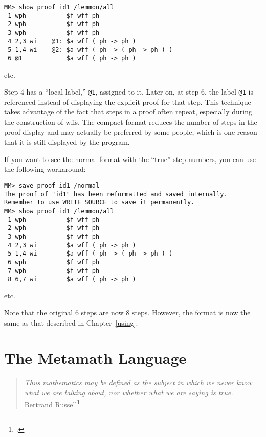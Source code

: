 \begin{verbatim}
MM> show proof id1 /lemmon/all
 1 wph           $f wff ph
 2 wph           $f wff ph
 3 wph           $f wff ph
 4 2,3 wi    @1: $a wff ( ph -> ph )
 5 1,4 wi    @2: $a wff ( ph -> ( ph -> ph ) )
 6 @1            $a wff ( ph -> ph )
\end{verbatim}

\begin{center}
{etc.}
\end{center}

Step 4 has a ``local label,'' \texttt{@1}, assigned to it.
Later on, at step 6, the label \texttt{@1} is referenced instead of
displaying the explicit proof for that step.  This technique takes advantage
of the fact that steps in a proof often repeat, especially during the
construction of wffs.  The compact format reduces the number of steps in the
proof display and may actually be preferred by some people, which is one
reason that it is still displayed by the program.

If you want to see the normal format with the ``true'' step numbers, you can
use the following workaround:

\begin{verbatim}
MM> save proof id1 /normal
The proof of "id1" has been reformatted and saved internally.
Remember to use WRITE SOURCE to save it permanently.
MM> show proof id1 /lemmon/all
 1 wph           $f wff ph
 2 wph           $f wff ph
 3 wph           $f wff ph
 4 2,3 wi        $a wff ( ph -> ph )
 5 1,4 wi        $a wff ( ph -> ( ph -> ph ) )
 6 wph           $f wff ph
 7 wph           $f wff ph
 8 6,7 wi        $a wff ( ph -> ph )
\end{verbatim}

\begin{center}
{etc.}
\end{center}

Note that the original 6 steps are now 8 steps.  However, the format is
now the same as that described in Chapter~\ref{using}.

\chapter{The Metamath Language}
\label{languagespec}

\begin{quote}
  {\em Thus mathematics may be defined as the subject in which we never know
what we are talking about, nor whether what we are saying is true.}
    \flushright\sc  Bertrand Russell\footnote{\cite[p.~84]{Russell2}.}\\
\end{quote}

